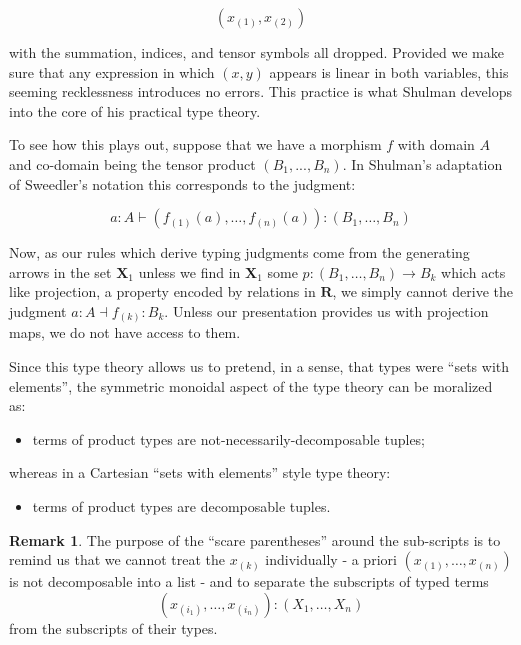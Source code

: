\documentclass[pra,floatfix,
amsmath,superscriptaddress, 12pt]{article}
\theoremstyle{definition}
\newtheorem*{remark}{Remark}
\begin{document}
    \[
    (x_{(1)}, x_{(2)})
    \]

with the summation, indices, and tensor symbols all dropped. Provided we make sure that any expression in which $(x,y)$ appears is linear in both variables, this seeming recklessness introduces no errors. This practice is what Shulman develops into the core of his practical type theory.

To see how this plays out, suppose that we have a morphism $f$ with domain $A$ and co-domain being the tensor product $(B_1,...,B_n)$. In Shulman's adaptation of Sweedler's notation this corresponds to the judgment:

\[
a:A\vdash\left(f_{\left(1\right)}\left(a\right),\dots,f_{\left(n\right)}\left(a\right)\right):\left(B_{1},\dots,B_{n}\right)
\]

Now, as our rules which derive typing judgments come from the generating arrows in the set $\mathbf{X}_1$ unless we find in $\mathbf{X}_1$ some $p:(B_1,\dots,B_n) \rightarrow B_k$ which acts like projection, a property encoded by relations in $\mathbf{R}$, we simply cannot derive the judgment $a:A \dashv f_{(k)}:B_k$. Unless our presentation provides us with projection maps, we do not have access to them.

Since this type theory allows us to pretend, in a sense, that types were ``sets with elements'', the symmetric monoidal aspect of the type theory can be moralized as:
\begin{itemize}
    \item terms of product types are not-necessarily-decomposable tuples;
\end{itemize}
whereas in a Cartesian ``sets with elements'' style type theory:
\begin{itemize}
    \item terms of product types are decomposable tuples.
\end{itemize}

\begin{remark}
	The purpose of the ``scare parentheses'' around the sub-scripts is to remind us that we cannot treat the $x_{(k)}$ individually - a priori $(x_{(1)},\dots,x_{(n)})$ is not decomposable into a list - and to separate the subscripts of typed terms
        \[
            (x_{(i_1)},\dots,x_{(i_n)}):(X_1,\dots,X_n)
        \]
    from the subscripts of their types.
\end{remark}

\end{document}
